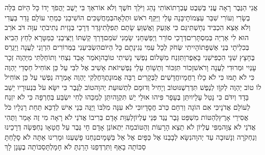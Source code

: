 \documentclass[../main/main.tex]{subfiles}
\begin{document}
\begin{multicols}{\ncols}
אֲנִי הַגֶּבֶר רָאָה עֳנִי בְּשֵׁבֶט עֶבְרָתוֹ\PreVerseSpace{}אוֹתִי נָהַג וַיֹּלַךְ חֹשֶׁךְ וְלֹא אוֹר\PreVerseSpace{}אַךְ בִּי יָשֻׁב יַהֲפֹךְ יָדוֹ כָּל הַיּוֹם \ClosedSection{}בִּלָּה בְשָׂרִי וְעוֹרִי שִׁבַּר עַצְמוֹתָי\PreVerseSpace{}בָּנָה עָלַי וַיַּקַּף רֹאשׁ וּתְלָאָה\PreVerseSpace{}בְּמַחֲשַׁכִּים הוֹשִׁיבַנִי כְּמֵתֵי עוֹלָם \ClosedSection{}גָּדַר בַּעֲדִי וְלֹא אֵצֵא הִכְבִּיד נְחָשְׁתִּי\PreVerseSpace{}גַּם כִּי אֶזְעַק וַאֲשַׁוֵּעַ שָׂתַם תְּפִלָּתִי\PreVerseSpace{}גָּדַר דְּרָכַי בְּגָזִית נְתִיבֹתַי עִוָּה \ClosedSection{}דֹּב אֹרֵב הוּא לִי אַרְיֵה בְּמִסְתָּרִים\PreVerseSpace{}דְּרָכַי סוֹרֵר וַיְפַשְּׁחֵנִי שָׂמַנִי שֹׁמֵם\PreVerseSpace{}דָּרַךְ קַשְׁתּוֹ וַיַּצִּיבֵנִי כַּמַּטָּרָא לַחֵץ \ClosedSection{}הֵבִיא בְּכִלְיֹתָי בְּנֵי אַשְׁפָּתוֹ\PreVerseSpace{}הָיִיתִי שְּׂחֹק לְכָל עַמִּי נְגִינָתָם כָּל הַיּוֹם\PreVerseSpace{}הִשְׂבִּיעַנִי בַמְּרוֹרִים הִרְוַנִי לַעֲנָה \ClosedSection{}וַיַּגְרֵס בֶּחָצָץ שִׁנָּי הִכְפִּישַׁנִי בָּאֵפֶר\PreVerseSpace{}וַתִּזְנַח מִשָּׁלוֹם נַפְשִׁי נָשִׁיתִי טוֹבָה\PreVerseSpace{}וָאֹמַר אָבַד נִצְחִי וְתוֹחַלְתִּי מִיַּהְוֶה \ClosedSection{}זְכָר עָנְיִי וּמְרוּדִי לַעֲנָה וָרֹאשׁ\PreVerseSpace{}זָכוֹר תִּזְכּוֹר וְתַשָׁוֹחַ\SubEnd{} עָלַי נַפְשִׁי\PreVerseSpace{}זֹאת אָשִׁיב אֶל לִבִּי עַל כֵּן אוֹחִיל \ClosedSection{}חַסְדֵי יַהְוֶה כִּי לֹא תָמּוּ\SubEnd{} כִּי לֹא כָלוּ רַחֲמָיו\PreVerseSpace{}חֲדָשִׁים לַבְּקָרִים רַבָּה אֱמוּנָתֶךָ\PreVerseSpace{}חֶלְקִי יַהְוֶה אָמְרָה נַפְשִׁי עַל כֵּן אוֹחִיל לוֹ \ClosedSection{}טוֹב יַהְוֶה לְקוָֹו לְנֶפֶשׁ תִּדְרְשֶׁנּוּ\PreVerseSpace{}טוֹב וְיָחִיל וְדוּמָם לִתְשׁוּעַת יְהוָה\PreVerseSpace{}טוֹב לַגֶּבֶר כִּי יִשָּׂא עֹל בִּנְעוּרָיו \ClosedSection{}יֵשֵׁב בָּדָד וְיִדֹּם כִּי נָטַל עָלָיו\PreVerseSpace{}יִתֵּן בֶּעָפָר פִּיהוּ אוּלַי יֵשׁ תִּקְוָה\PreVerseSpace{}יִתֵּן לְמַכֵּהוּ לֶחִי יִשְׂבַּע בְּחֶרְפָּה \ClosedSection{}כִּי לֹא יִזְנַח לְעוֹלָם אֲדֹנָי\PreVerseSpace{}כִּי אִם הוֹגָה וְרִחַם כְּרֹב חֲסָדָיו\PreVerseSpace{}כִּי לֹא עִנָּה מִלִּבּוֹ וַיַּגֶּה בְּנֵי אִישׁ \ClosedSection{}לְדַכֵּא תַּחַת רַגְלָיו כֹּל אֲסִירֵי אָרֶץ\PreVerseSpace{}לְהַטּוֹת מִשְׁפַּט גָּבֶר נֶגֶד פְּנֵי עֶלְיוֹן\PreVerseSpace{}לְעַוֵּת אָדָם בְּרִיבוֹ אֲדֹנַי לֹא רָאָה \ClosedSection{}מִי זֶה אָמַר וַתֶּהִי אֲדֹנַי לֹא צִוָּה\PreVerseSpace{}מִפִּי עֶלְיוֹן לֹא תֵצֵא הָרָעוֹת וְהַטּוֹב\PreVerseSpace{}מַה יִּתְאוֹנֵן אָדָם חָי גֶּבֶר עַל חֲטָאָו \ClosedSection{}נַחְפְּשָׂה דְרָכֵינוּ וְנַחְקֹרָה וְנָשׁוּבָה עַד יְהוָה\PreVerseSpace{}נִשָּׂא לְבָבֵנוּ אֶל כַּפָּיִם אֶל אֵל בַּשָּׁמָיִם\PreVerseSpace{}נַחְנוּ פָשַׁעְנוּ וּמָרִינוּ אַתָּה לֹא סָלָחְתָּ \ClosedSection{}סַכּוֹתָה בָאַף וַתִּרְדְּפֵנוּ הָרַגְתָּ לֹא חָמָלְתָּ\PreVerseSpace{}סַכּוֹתָה בֶעָנָן לָךְ 
\end{multicols}
\end{document}

